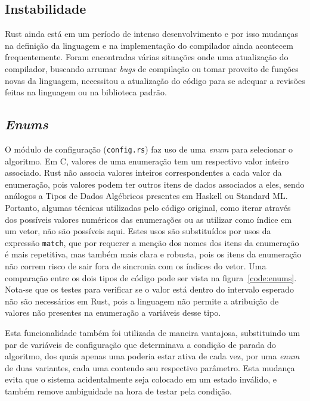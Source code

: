 \documentclass[tg]{mdtufsm}
\def\Cpp{{C\nolinebreak[4]\raisebox{.20ex}{\small\bf++}}}
\begin{document}
\subsection{Instabilidade}

Rust ainda está em um período de intenso desenvolvimento e por isso mudanças na definição da linguagem e na implementação do compilador ainda acontecem frequentemente. Foram encontradas várias situações onde uma atualização do compilador, buscando arrumar \emph{bugs} de compilação ou tomar proveito de funções novas da linguagem, necessitou a atualização do código para se adequar a revisões feitas na linguagem ou na biblioteca padrão.

\subsection{\emph{Enums}}

O módulo de configuração (\texttt{config.rs}) faz uso de uma \emph{enum} para selecionar o algoritmo. Em \Cpp, valores de uma enumeração tem um respectivo valor inteiro associado. Rust não associa valores inteiros correspondentes a cada valor da enumeração, pois valores podem ter outros itens de dados associados a eles, sendo análogos a Tipos de Dados Algébricos presentes em Haskell ou Standard ML.  Portanto, algumas técnicas utilizadas pelo código original, como iterar através dos possíveis valores numéricos das enumerações ou as utilizar como índice em um vetor, não são possíveis aqui. Estes usos são substituídos por usos da expressão \texttt{match}, que por requerer a menção dos nomes dos itens da enumeração é mais repetitiva, mas também mais clara e robusta, pois os itens da enumeração não correm risco de sair fora de sincronia com os índices do vetor. Uma comparação entre os dois tipos de código pode ser vista na figura~\ref{code:enums}. Nota-se que os testes para verificar se o valor está dentro do intervalo esperado não são necessários em Rust, pois a linguagem não permite a atribuição de valores não presentes na enumeração a variáveis desse tipo.

Esta funcionalidade também foi utilizada de maneira vantajosa, substituindo um par de variáveis de configuração que determinava a condição de parada do algoritmo, dos quais apenas uma poderia estar ativa de cada vez, por uma \emph{enum} de duas variantes, cada uma contendo seu respectivo parâmetro. Esta mudança evita que o sistema acidentalmente seja colocado em um estado inválido, e também remove ambiguidade na hora de testar pela condição.
\end{document}
